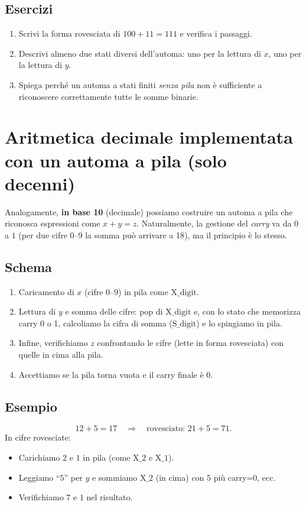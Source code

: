 \documentclass[a4paper,12pt]{report}
\begin{document}
\subsection*{Esercizi}
\begin{enumerate}
    \item Scrivi la forma rovesciata di \(100 + 11 = 111\) e verifica i passaggi.
    \item Descrivi almeno due stati diversi dell’automa: uno per la lettura di \(x\), uno per la lettura di \(y\).  
    \item Spiega perché un automa a stati finiti \emph{senza pila} non è sufficiente a riconoscere correttamente tutte le somme binarie.
\end{enumerate}


\section{Aritmetica decimale implementata con un automa a pila (solo decenni)}\label{sec:automa_dec}
Analogamente, \textbf{in base 10} (decimale) possiamo costruire un automa a pila che riconosca espressioni come \(x + y = z\). Naturalmente, la gestione del \emph{carry} va da \(0\) a \(1\) (per due cifre 0--9 la somma può arrivare a 18), ma il principio è lo stesso.

\subsection*{Schema}
\begin{enumerate}
    \item Caricamento di \(x\) (cifre 0--9) in pila come \(\mathrm{X\_digit}\).
    \item Lettura di \(y\) e somma delle cifre: pop di \(\mathrm{X\_digit}\) e, con lo stato che memorizza carry 0 o 1, calcoliamo la cifra di somma (\(\mathrm{S\_digit}\)) e lo spingiamo in pila.
    \item Infine, verifichiamo \(z\) confrontando le cifre (lette in forma rovesciata) con quelle in cima alla pila.
    \item Accettiamo se la pila torna vuota e il carry finale è 0.
\end{enumerate}

\subsection*{Esempio}
\[
12 + 5 = 17 \quad\Rightarrow\quad \text{rovesciato: }21 + 5 = 71.
\]
In cifre rovesciate:
\begin{itemize}
    \item Carichiamo \(2\) e \(1\) in pila (come \(\mathrm{X\_2}\) e \(\mathrm{X\_1}\)).
    \item Leggiamo “\(5\)” per \(y\) e sommiamo \(\mathrm{X\_2}\) (in cima) con 5 più carry=0, ecc.
    \item Verifichiamo \(7\) e \(1\) nel risultato.
\end{itemize}
\end{document}
